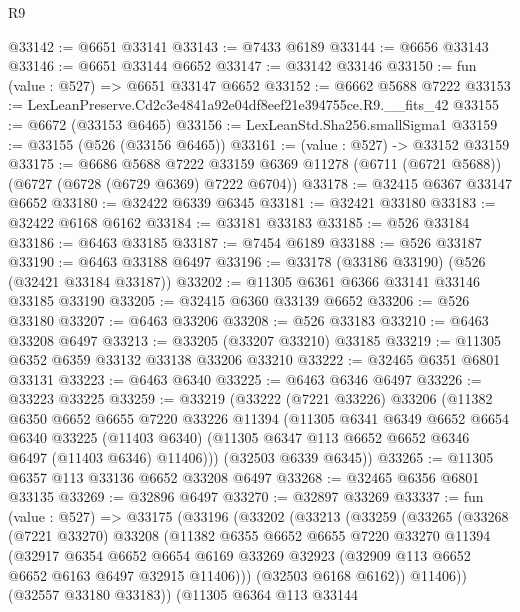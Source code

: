 \begin{lexlean}{R9}
\begin{coremodule}
@33142 := @6651 @33141
@33143 := @7433 @6189
@33144 := @6656 @33143
@33146 := @6651 @33144 @6652
@33147 := @33142 @33146
@33150 := fun (value : @527) => @6651 @33147 @6652
@33152 := @6662 @5688 @7222
@33153 := LexLeanPreserve.Cd2c3e4841a92e04df8eef21e394755ce.R9.__fits_42
@33155 := @6672 (@33153 @6465)
@33156 := LexLeanStd.Sha256.smallSigma1
@33159 := @33155 (@526 (@33156 @6465))
@33161 := (value : @527) -> @33152 @33159
@33175 := @6686
    @5688
    @7222
    @33159
    @6369
    @11278
    (@6711 (@6721 @5688))
    (@6727 (@6728 (@6729 @6369) @7222 @6704))
@33178 := @32415 @6367 @33147 @6652
@33180 := @32422 @6339 @6345
@33181 := @32421 @33180
@33183 := @32422 @6168 @6162
@33184 := @33181 @33183
@33185 := @526 @33184
@33186 := @6463 @33185
@33187 := @7454 @6189
@33188 := @526 @33187
@33190 := @6463 @33188 @6497
@33196 := @33178 (@33186 @33190) (@526 (@32421 @33184 @33187))
@33202 := @11305 @6361 @6366 @33141 @33146 @33185 @33190
@33205 := @32415 @6360 @33139 @6652
@33206 := @526 @33180
@33207 := @6463 @33206
@33208 := @526 @33183
@33210 := @6463 @33208 @6497
@33213 := @33205 (@33207 @33210) @33185
@33219 := @11305 @6352 @6359 @33132 @33138 @33206 @33210
@33222 := @32465 @6351 @6801 @33131
@33223 := @6463 @6340
@33225 := @6463 @6346 @6497
@33226 := @33223 @33225
@33259 := @33219
    (@33222
      (@7221 @33226)
      @33206
      (@11382
        @6350
        @6652
        @6655
        @7220
        @33226
        @11394
        (@11305
          @6341
          @6349
          @6652
          @6654
          @6340
          @33225
          (@11403 @6340)
          (@11305 @6347 @113 @6652 @6652 @6346 @6497 (@11403 @6346) @11406)))
      (@32503 @6339 @6345))
@33265 := @11305 @6357 @113 @33136 @6652 @33208 @6497
@33268 := @32465 @6356 @6801 @33135
@33269 := @32896 @6497
@33270 := @32897 @33269
@33337 := fun (value : @527) =>
  @33175
    (@33196
      (@33202
        (@33213
          (@33259
            (@33265
              (@33268
                (@7221 @33270)
                @33208
                (@11382
                  @6355
                  @6652
                  @6655
                  @7220
                  @33270
                  @11394
                  (@32917
                    @6354
                    @6652
                    @6654
                    @6169
                    @33269
                    @32923
                    (@32909 @113 @6652 @6652 @6163 @6497 @32915 @11406)))
                (@32503 @6168 @6162))
              @11406))
          (@32557 @33180 @33183))
        (@11305
          @6364
          @113
          @33144

\end{coremodule}
\end{lexlean}
